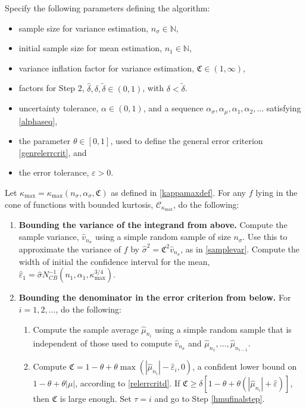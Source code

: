 \documentclass[graybox]{svmult}
\newcommand{\hv}{\hat{v}}
\newcommand{\fudge}{\mathfrak{C}}
\newcommand{\abs}[1]{\left|#1\right|}
\newcommand{\hmu}{\hat{\mu}}
\newcommand{\naturals}{\mathbb{N}}
\newcommand{\hdelta}{\hat{\delta}}
\newcommand{\hvareps}{\hat{\varepsilon}}
\newcommand{\hsigma}{\hat{\sigma}}
\newcommand{\tdelta}{\tilde{\delta}}
\newcommand{\fc}{\mathfrak{C}}
\newcommand{\cc}{\mathcal{C}}
\def\abs#1{\ensuremath{\left \lvert #1 \right \rvert}}
\begin{document}
\begin{theorem} \label{relerradaptthm} Specify the following parameters defining the algorithm:
\begin{itemize}
\item sample size for variance estimation, $n_{\sigma} \in \naturals$,
\item initial sample size for mean estimation, $n_1 \in \naturals$,
\item variance inflation factor for variance estimation, $\fudge \in (1,\infty)$, 
\item factors for Step 2, $\hdelta, \delta, \tdelta \in (0,1)$, with $\delta < \tdelta$.
\item uncertainty tolerance, $\alpha\in (0,1)$, and a sequence $\alpha_{\sigma}, \alpha_{\mu}, \alpha_1,  \alpha_2, \ldots$ satisfying \eqref{alphaseq}, 
\item the parameter $\theta \in [0,1]$, used to define the general error criterion \eqref{genrelerrcrit}, and
\item the error tolerance, $\varepsilon >0$. 
\end{itemize} 
Let $\kappa_{\max}=\kappa_{\max}(n_{\sigma},\alpha_{\sigma},\fudge)$ as defined in \eqref{kappamaxdef}.  For any $f$ lying in the cone of functions with bounded kurtosis, $\cc_{\kappa_{\max}}$, do the following:
\begin{enumerate}
\item {\bf Bounding the variance of the integrand from above.} Compute the sample variance, $\hv_{n_{\sigma}}$ using a simple random sample of size $n_{\sigma}$. Use this to approximate the variance of $f$ by $\hsigma^2 = \fudge^2 \hv_{n_{\sigma}}$, as in \eqref{samplevar}. Compute the width of initial the confidence interval for the mean, $\hvareps_1=\hsigma N_{CB}^{-1}(n_1,\alpha_1,\kappa_{\max}^{3/4})$.

\item \label{boundcstep} {\bf Bounding the denominator in the error criterion  from below.} For $i=1, 2, \ldots$, do the following:

\begin{enumerate}

\item Compute the sample average $\hmu_{n_i}$ using a simple random sample that is independent of those used to compute $\hv_{n_{\sigma}}$ and $\hmu_{n_1}, \ldots, \hmu_{n_{i-1}}$.

\item Compute $\fc=1-\theta + \theta\max(\abs{\hmu_{n_i}}-\hvareps_{i},0)$, a confident lower bound on $1-\theta + \theta\abs{\mu}$, according to \eqref{relerrcritd}.  If $\fc \ge \delta [1 - \theta + \theta(\abs{\hmu_{n_i}} + \hvareps)]$, then $\fc$ is large enough.  Set $\tau=i$ and go to Step \ref{hmufinalstep}.


\end{enumerate}
\end{enumerate}
\end{theorem}
\end{document}
